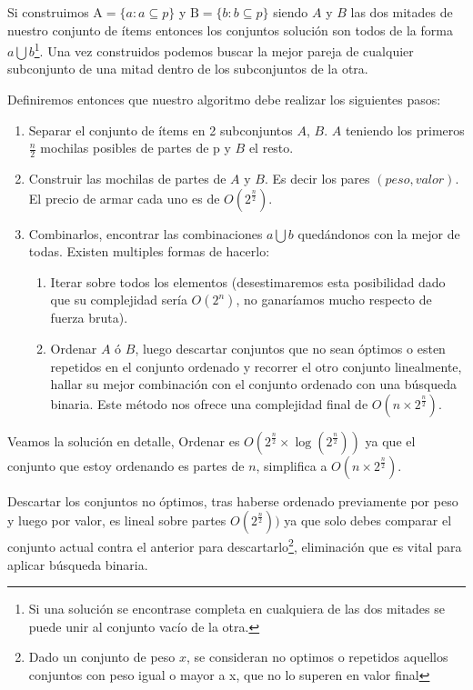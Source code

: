 \documentclass[fleqn, 11pt]{article}
\begin{document}
Si construimos $\text{A} = \{a : a \subseteq p\}$ y $\text{B} = \{b : b
\subseteq p\}$ siendo $A$ y $B$ las dos mitades de nuestro conjunto de ítems
entonces los conjuntos solución son todos de la forma $a \bigcup b$\footnote{Si
una solución se encontrase completa en cualquiera de las dos mitades se puede
unir al conjunto vacío de la otra.}. Una vez construidos podemos buscar la
mejor pareja de cualquier subconjunto de una mitad dentro de los subconjuntos
de la otra.

Definiremos entonces que nuestro algoritmo debe realizar los siguientes pasos:

\begin{enumerate}
\item Separar el conjunto de ítems en 2 subconjuntos $A$, $B$. $A$ teniendo los
primeros $\frac{n}{2}$ mochilas posibles de partes de p y $B$ el resto.

\item Construir las mochilas de partes de $A$ y $B$. Es decir los pares $(peso, valor)$. El precio de armar cada uno es de $O(2^{\frac{n}{2}})$.

\item Combinarlos, encontrar las combinaciones $a \bigcup b$ quedándonos con la
mejor de todas. Existen multiples formas de hacerlo:

\begin{enumerate}
	\item Iterar sobre todos los elementos (desestimaremos esta posibilidad
	dado que su complejidad sería $O(2^n)$, no ganaríamos mucho respecto de
	fuerza bruta).

	\item Ordenar $A$ ó $B$, luego descartar conjuntos que no sean óptimos o esten repetidos en el conjunto ordenado y recorrer el otro conjunto linealmente, hallar su mejor combinación con el conjunto ordenado con una búsqueda binaria. Este método nos ofrece una complejidad final
	de $O(n \times 2^{\frac{n}{2}})$.
\end{enumerate}
\end{enumerate}

Veamos la solución en detalle, Ordenar es $O(2^\frac{n}{2} \times \log(2^\frac{n}{2}))$ ya que el conjunto que estoy ordenando es partes de $n$, simplifica a $O(n \times 2^{\frac{n}{2}})$.

Descartar los conjuntos no óptimos, tras haberse ordenado previamente por peso y luego por valor, es lineal sobre partes $O(2^\frac{n}{2}))$ ya que solo debes comparar el conjunto actual contra el anterior para descartarlo\footnote{ Dado un conjunto de peso $x$, se consideran no optimos o repetidos aquellos conjuntos con peso igual o mayor a x, que no lo superen en valor final}, eliminación que es vital para aplicar búsqueda binaria.
\end{document}
